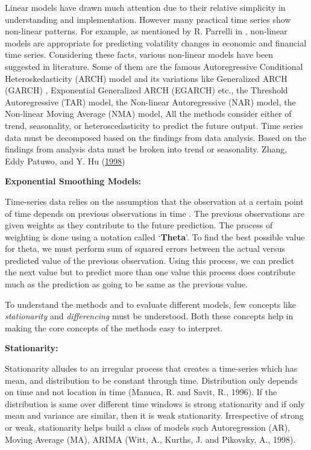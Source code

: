 \documentclass[12pt,a4paper]{book}
\begin{document}
{Linear models have drawn much attention due to their relative simplicity
in understanding and implementation. However many practical time series
show non-linear patterns. For example, as mentioned by R. Parrelli in ,
non-linear models are appropriate for predicting volatility changes in
economic and financial time series. Considering these facts, various
non-linear models have been suggested in literature. Some of them are
the famous Autoregressive Conditional Heteroskedasticity (ARCH) model
and its variations like Generalized ARCH (GARCH) , Exponential
Generalized ARCH (EGARCH) etc., the Threshold Autoregressive (TAR)
model, the Non-linear Autoregressive (NAR) model, the Non-linear Moving
Average (NMA) model, All the methods consider either of trend,
seasonality, or heteroscedasticity to predict the future output. Time
series data must be decomposed based on the findings from data analysis.
Based on the findings from analysis data must be broken into trend or
seasonality. Zhang, Eddy Patuwo, and Y. Hu
(\protect\hyperlink{ref-zhang1998}{1998})

\textbf{Exponential Smoothing Models:}

Time-series data relies on the assumption that the observation at a
certain point of time depends on previous observations in time . The
previous observations are given weights as they contribute to the future
prediction. The process of weighting is done using a notation called
`\textbf{Theta}'. To find the best possible value for theta, we must
perform sum of squared errors between the actual versus predicted value
of the previous observation. Using this process, we can predict the next
value but to predict more than one value this process does contribute
much as the prediction as going to be same as the previous value.

To understand the methods and to evaluate different models, few concepts
like \emph{stationarity} and \emph{differencing} must be understood.
Both these concepts help in making the core concepts of the methods easy
to interpret.

\textbf{Stationarity:}

Stationarity alludes to an irregular process that creates a time-series
which has mean, and distribution to be constant through time.
Distribution only depends on time and not location in time (Manuca, R.
and Savit, R., 1996). If the distribution is same over different time
windows is strong stationarity and if only mean and variance are
similar, then it is weak stationarity. Irrespective of strong or weak,
stationarity helps build a class of models such Autoregression (AR),
Moving Average (MA), ARIMA (Witt, A., Kurths, J. and Pikovsky, A.,
1998).

}
\end{document}
